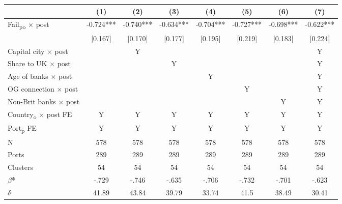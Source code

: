 {
\def\sym#1{\ifmmode^{#1}\else\(^{#1}\)\fi}
\begin{tabular}{l*{7}{c}}
\toprule
            &\multicolumn{1}{c}{(1)}   &\multicolumn{1}{c}{(2)}   &\multicolumn{1}{c}{(3)}   &\multicolumn{1}{c}{(4)}   &\multicolumn{1}{c}{(5)}   &\multicolumn{1}{c}{(6)}   &\multicolumn{1}{c}{(7)}   \\
\midrule
Fail\textsubscript{po} $\times$ post&      -0.724***&      -0.740***&      -0.634***&      -0.704***&      -0.727***&      -0.698***&      -0.622***\\
            &     [0.167]   &     [0.170]   &     [0.177]   &     [0.195]   &     [0.219]   &     [0.183]   &     [0.224]   \\
Capital city $\times$ post &               &           Y   &               &               &               &               &           Y   \\
Share to UK $\times$ post &               &               &           Y   &               &               &               &           Y   \\
Age of banks $\times$ post&               &               &               &           Y   &               &               &           Y   \\
OG connection $\times$ post&               &               &               &               &           Y   &               &           Y   \\
Non-Brit banks $\times$ post&               &               &               &               &               &           Y   &           Y   \\
Country\textsubscript{o} $\times$ post FE&           Y   &           Y   &           Y   &           Y   &           Y   &           Y   &           Y   \\
Port\textsubscript{p} FE &           Y   &           Y   &           Y   &           Y   &           Y   &           Y   &           Y   \\
\midrule
N           &         578   &         578   &         578   &         578   &         578   &         578   &         578   \\
Ports       &         289   &         289   &         289   &         289   &         289   &         289   &         289   \\
Clusters    &          54   &          54   &          54   &          54   &          54   &          54   &          54   \\
$\beta$*    &       -.729   &       -.746   &       -.635   &       -.706   &       -.732   &       -.701   &       -.623   \\
$\delta$    &       41.89   &       43.84   &       39.79   &       33.74   &        41.5   &       38.49   &       30.41   \\
\bottomrule
\end{tabular}
}
